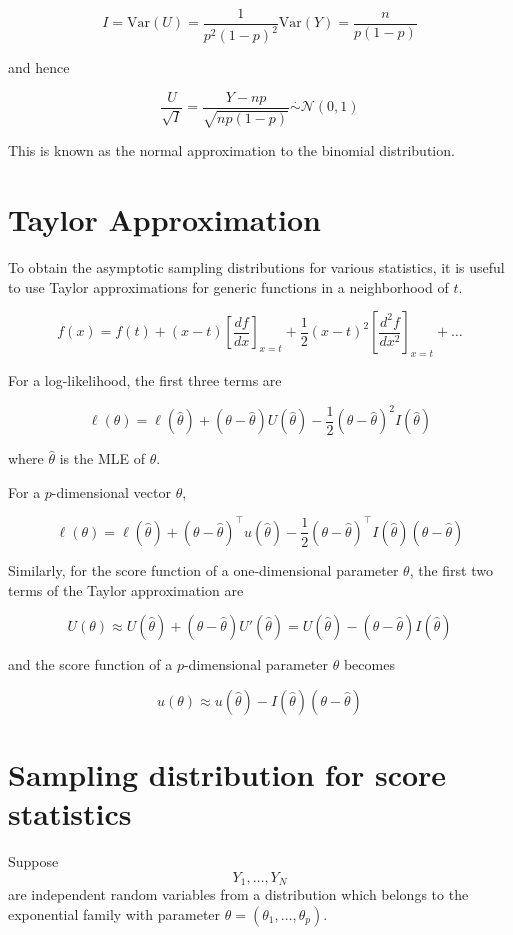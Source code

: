 \documentclass[11pt]{article}
\begin{document}
\[ I = \text{Var}(U) = \frac{1}{p^2(1 - p)^2} \text{Var}(Y) = \frac{n}{p(1 - p)} \]

and hence

\[\frac{U}{\sqrt{I}} = \frac{Y - np}{\sqrt{np(1 - p)}} \stackrel{\cdot}{\sim} \mathcal{N}(0, 1)\]

This is known as the normal approximation to the binomial distribution.

\section{Taylor Approximation}

To obtain the asymptotic sampling distributions for various statistics, it is useful to use Taylor approximations for generic functions in a neighborhood of \( t \).

\[f(x) = f(t) + (x - t)\left[ \frac{df}{dx} \right]_{x=t} + \frac{1}{2}(x - t)^2 \left[ \frac{d^2f}{dx^2} \right]_{x=t} + \ldots\]

For a log-likelihood, the first three terms are

\[\ell(\theta) = \ell(\hat{\theta}) + (\theta - \hat{\theta})U(\hat{\theta}) - \frac{1}{2}(\theta - \hat{\theta})^2I(\hat{\theta})\]

where \(\hat{\theta}\) is the MLE of \(\theta\).

For a \(p\)-dimensional vector \(\theta\),

\[ \ell(\theta) = \ell(\hat{\theta}) + (\theta - \hat{\theta})^\top u(\hat{\theta}) - \frac{1}{2}(\theta - \hat{\theta})^\top I(\hat{\theta})(\theta - \hat{\theta})\]

Similarly, for the score function of a one-dimensional parameter \(\theta\), the first two terms of the Taylor approximation are

\[ U(\theta) \approx U(\hat{\theta}) + (\theta - \hat{\theta})U'(\hat{\theta}) = U(\hat{\theta}) - (\theta - \hat{\theta})I(\hat{\theta})\]

and the score function of a \( p \)-dimensional parameter \(\theta\) becomes

\[ u(\theta) \approx u(\hat{\theta}) - I(\hat{\theta})(\theta - \hat{\theta})\]

\section{Sampling distribution for score statistics}

Suppose \[Y_1, \ldots, Y_N \] are independent random variables from a distribution which belongs to the exponential family with parameter \( \theta = (\theta_1, \ldots, \theta_p) \).
\end{document}
